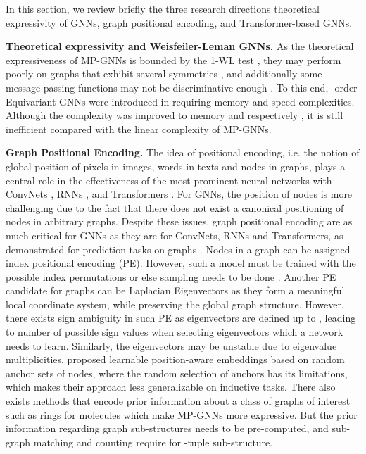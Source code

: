 \documentclass{article} \usepackage{iclr2021_conference,times}
\begin{document}
In this section, we review briefly the three research directions theoretical expressivity of GNNs, graph positional encoding, and Transformer-based GNNs.



\textbf{Theoretical expressivity and Weisfeiler-Leman GNNs.}
As the theoretical expressiveness of MP-GNNs is bounded by the 1-WL test \citep{xu2018how, morris2019weisfeiler}, they may perform poorly on graphs that exhibit several symmetries \citep{murphy2019relational}, and additionally some message-passing functions may not be discriminative enough \citep{corso2020principal}. To this end, -order Equivariant-GNNs were introduced in \cite{maron2018invariant} requiring  memory and speed complexities. Although the complexity was improved to  memory and  respectively \citep{maron2019provably,chen2019equivalence,azizian2020expressive}, it is still inefficient compared with the linear complexity of MP-GNNs.




{\bf Graph Positional Encoding.}
The idea of positional encoding, i.e. the notion of global position of pixels in images, words in texts and nodes in graphs, plays a central role in the effectiveness of the most prominent neural networks with ConvNets \citep{lecun1998gradient}, RNNs \citep{hochreiter1997long}, and Transformers \citep{vaswani2017attention}. For GNNs, the position of nodes is more challenging due to the fact that there does not exist a canonical positioning of nodes in arbitrary graphs. Despite these issues, graph positional encoding are as much critical for GNNs as they are for ConvNets, RNNs and Transformers, as demonstrated for prediction tasks on graphs \citep{srinivasan2019equivalence, cui2021positional}. 
Nodes in a graph can be assigned index positional encoding (PE). However, such a model must be trained with the  possible index permutations or else sampling needs to be done \citep{murphy2019relational}. Another PE candidate for graphs can be Laplacian Eigenvectors \citep{dwivedi2020benchmarking, dwivedi2021generalization} as they form a meaningful local coordinate system, while preserving the global graph structure. However, there exists sign ambiguity in such PE as eigenvectors are defined up to , leading to  number of possible sign values when selecting  eigenvectors which a network needs to learn. Similarly, the eigenvectors may be unstable due to eigenvalue multiplicities. \cite{you2019position} proposed learnable position-aware embeddings based on random anchor sets of nodes, where the random selection of anchors has its limitations, which makes their approach less generalizable on inductive tasks. There also exists methods that encode prior information about a class of graphs of interest such as rings for molecules \citep{bouritsas2020improving, bodnar2021weisfeiler} which make MP-GNNs more expressive. But the prior information regarding graph sub-structures needs to be pre-computed, and sub-graph matching and counting require  for -tuple sub-structure.
\end{document}
